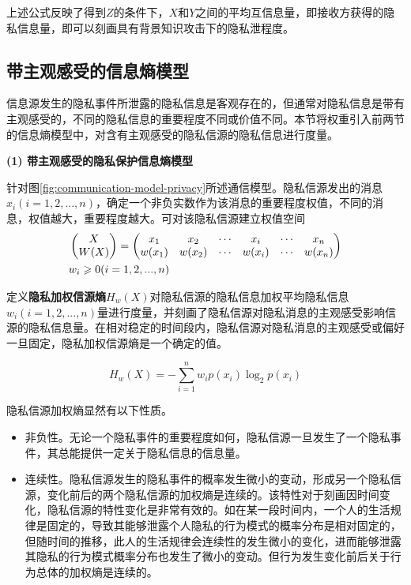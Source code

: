 上述公式反映了得到$Z$的条件下，$X$和$Y$之间的平均互信息量，即接收方获得的隐私信息量，即可以刻画具有背景知识攻击下的隐私泄程度。

\subsection{带主观感受的信息熵模型}

信息源发生的隐私事件所泄露的隐私信息是客观存在的，但通常对隐私信息是带有主观感受的，不同的隐私信息的重要程度不同或价值不同。本节将权重引入前两节的信息熵模型中，对含有主观感受的隐私信源的隐私信息进行度量。

\textbf{(1) 带主观感受的隐私保护信息熵模型}

针对图\ref{fig:communication-model-privacy}所述通信模型。隐私信源发出的消息$x_{i}(i=1,2,...,n)$，确定一个非负实数作为该消息的重要程度权值，不同的消息，权值越大，重要程度越大。可对该隐私信源建立权值空间
\begin{equation}
\centering
\begin{split}
&\begin{pmatrix}
X\\ 
W(X)
\end{pmatrix}=\begin{pmatrix}
x_{1} & x_{2} & \cdots  & x_{i} & \cdots  & x_{n}\\ 
w(x_{1})& w(x_{2}) & \cdots & w(x_{i}) & \cdots & w(x_{n})
\end{pmatrix} \\
&w_{i}\geqslant 0(i=1,2,...,n)
\end{split}
\end{equation}

定义\textbf{隐私加权信源熵}$H_{w}(X)$对隐私信源的隐私信息加权平均隐私信息$w_{i}(i=1,2,...,n)$量进行度量，并刻画了隐私信源对隐私消息的主观感受影响信源的隐私信息量。在相对稳定的时间段内，隐私信源对隐私消息的主观感受或偏好一旦固定，隐私加权信源熵是一个确定的值。

\begin{equation}
H_{w}(X)=-\sum_{i=1}^{n}w_{i}p(x_{i})\log_{2}p(x_{i})
\end{equation}

隐私信源加权熵显然有以下性质。
\begin{itemize}
	\item 非负性。无论一个隐私事件的重要程度如何，隐私信源一旦发生了一个隐私事件，其总能提供一定关于隐私信息的信息量。
	\item 连续性。隐私信源发生的隐私事件的概率发生微小的变动，形成另一个隐私信源，变化前后的两个隐私信源的加权熵是连续的。该特性对于刻画因时间变化，隐私信源的特性变化是非常有效的。如在某一段时间内，一个人的生活规律是固定的，导致其能够泄露个人隐私的行为模式的概率分布是相对固定的，但随时间的推移，此人的生活规律会连续性的发生微小的变化，进而能够泄露其隐私的行为模式概率分布也发生了微小的变动。但行为发生变化前后关于行为总体的加权熵是连续的。
\end{itemize}

